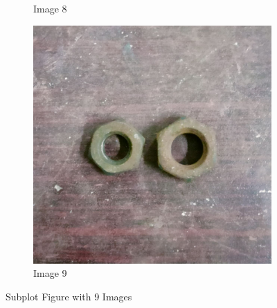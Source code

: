 \documentclass[12pt]{article}
\begin{document}
\begin{figure}
\begin{subfigure}{0.3\textwidth}
      \caption{Image 8}
  \end{subfigure}
  \hfill
  \begin{subfigure}{0.3\textwidth}
      \includegraphics[width=\linewidth]{img/09.jpg}
      \caption{Image 9}
  \end{subfigure}

  \caption{Subplot Figure with 9 Images}
\end{figure}
 
\end{document}
